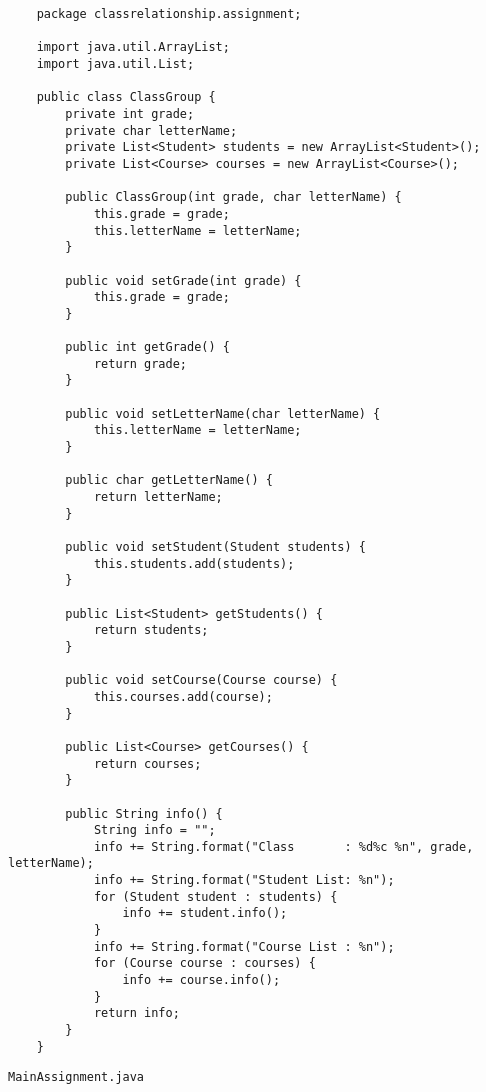 \documentclass[12pt,titlepage]{article}
\begin{document}
\begin{verbatim}
    package classrelationship.assignment;

    import java.util.ArrayList;
    import java.util.List;

    public class ClassGroup {
        private int grade;
        private char letterName;
        private List<Student> students = new ArrayList<Student>();
        private List<Course> courses = new ArrayList<Course>();

        public ClassGroup(int grade, char letterName) {
            this.grade = grade;
            this.letterName = letterName;
        }

        public void setGrade(int grade) {
            this.grade = grade;
        }

        public int getGrade() {
            return grade;
        }

        public void setLetterName(char letterName) {
            this.letterName = letterName;
        }

        public char getLetterName() {
            return letterName;
        }

        public void setStudent(Student students) {
            this.students.add(students);
        }

        public List<Student> getStudents() {
            return students;
        }

        public void setCourse(Course course) {
            this.courses.add(course);
        }

        public List<Course> getCourses() {
            return courses;
        }

        public String info() {
            String info = "";
            info += String.format("Class       : %d%c %n", grade, letterName);
            info += String.format("Student List: %n");
            for (Student student : students) {
                info += student.info();
            }
            info += String.format("Course List : %n");
            for (Course course : courses) {
                info += course.info();
            }
            return info;
        }
    }
\end{verbatim}
\texttt{MainAssignment.java}
\end{document}
